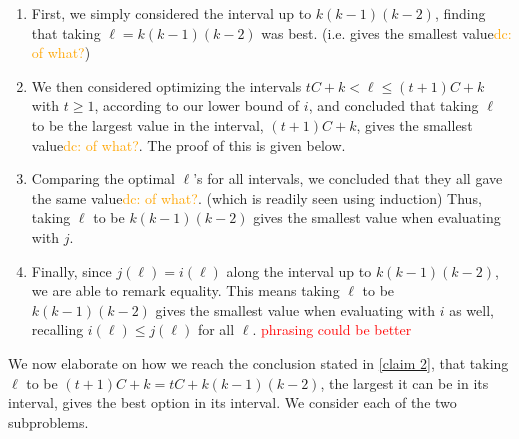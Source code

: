 \documentclass{article}
\theoremstyle{definition}
\newcommand{\hide}[1]{}
\newcommand{\edit}[1]{\textcolor{red}{#1}}
\newcommand{\dc}[1]{\textcolor{orange}{dc: #1}}
\begin{document}
\begin{enumerate}[label=Proposition \arabic*]
    \item\label{claim 1} First, we simply considered the interval up to $k(k-1)(k-2)$, finding that taking $\ell = k(k-1)(k-2)$ was best. (i.e. gives the smallest value\dc{ of what?})

\item\label{claim 2}  We then considered optimizing the intervals $tC+k < \ell \leq (t+1)C+k$ with $t \geq 1$, according to our lower bound of $i$, and concluded that taking $\ell$ to be the largest value in the interval, $(t+1)C+k$, gives the smallest value\dc{ of what?}. The proof of this is given below.

\item Comparing the optimal $\ell$'s for all intervals, we concluded that they all gave the same value\dc{ of what?}. (which is readily seen using induction) Thus, taking $\ell$ to be $k(k-1)(k-2)$ gives the smallest value when evaluating with $j$.

\item Finally, since $j(\ell)=i(\ell)$ along the interval up to $k(k-1)(k-2)$, we are able to remark equality. This means taking $\ell$ to be $k(k-1)(k-2)$ gives the smallest value when evaluating with $i$ as well, recalling $i(\ell) \le j(\ell)$ for all $\ell$.\edit{ phrasing could be better}
\end{enumerate}
\hide{
 First, we simply considered the interval up to $k(k-1)(k-2)$, finding that taking $\ell = k(k-1)(k-2)$ was best. (i.e. gives the smallest value)

We then considered optimizing the intervals $tC+k < \ell \leq (t+1)C+k$ with $t \geq 1$, according to our lower bound of $i$, and concluded that taking $\ell$ to be the largest value in the interval, $(t+1)C+k$, gives the smallest value. (*) 

Comparing the optimal $\ell$'s for all intervals, we concluded that they all gave the same value. (which is readily seen using induction)\edit{ handling parentheticals; clarifying that they are equal when evalutating according to the lower bound}  Thus, taking $\ell$ to be $k(k-1)(k-2)$ gives the smallest value when evaluating with $j$.

Finally, since $j(\ell)=i(\ell)$ along the interval up to $k(k-1)(k-2)$, we are able to remark equality. This means taking $\ell$ to be $k(k-1)(k-2)$ gives the smallest value when evaluating with $i$ as well.}


\vspace{1.75em}
We now elaborate on how we reach the conclusion stated in \ref{claim 2}, that taking $\ell$ to be $(t+1)C+k = tC+k(k-1)(k-2)$, the largest it can be in its interval, gives the best option in its interval. We consider each of the two subproblems.
\end{document}
